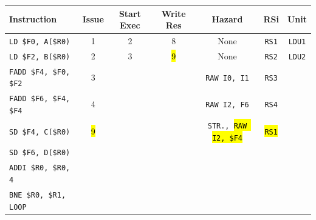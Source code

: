 \begin{enumerate}
    \begin{table}[!htp]
        \centering
        \begin{adjustbox}{width={\textwidth},totalheight={\textheight},keepaspectratio}
        \begin{tabular}{@{} l c c c c c c @{}}
            \toprule
            \textbf{Instruction} & \textbf{Issue} & \textbf{Start Exec} & \textbf{Write Res} & \textbf{Hazard} & \textbf{RSi} & \textbf{Unit} \\
            \midrule
            \texttt{LD \$F0, A(\$R0)}       & 1 & 2 & 8 & None  & \texttt{RS1}   & \texttt{LDU1}  \\ [.5em]
            \texttt{LD \$F2, B(\$R0)}       & 2 & 3 & \hl{9} & None  & \texttt{RS2}   & \texttt{LDU2}  \\ [.5em]
            \texttt{FADD \$F4, \$F0, \$F2}  & 3 &   &   & \texttt{RAW I0, I1} & \texttt{RS3} &       \\ [.5em]
            \texttt{FADD \$F6, \$F4, \$F4}  & 4 &   &   & \texttt{RAW I2, F6} & \texttt{RS4} &       \\ [.5em]
            \texttt{SD \$F4, C(\$R0)}       & \hl{9} &   &   & \texttt{STR., \hl{RAW I2, \$F4}} & \hl{\texttt{RS1}} &       \\ [.5em]
            \texttt{SD \$F6, D(\$R0)}       &   &   &   &       &       &       \\ [.5em]
            \texttt{ADDI \$R0, \$R0, 4}     &   &   &   &       &       &       \\ [.5em]
            \texttt{BNE \$R0, \$R1, LOOP}   &   &   &   &       &       &       \\
            \bottomrule
        \end{tabular}
        \end{adjustbox}
    \end{table}
    

\end{enumerate}
